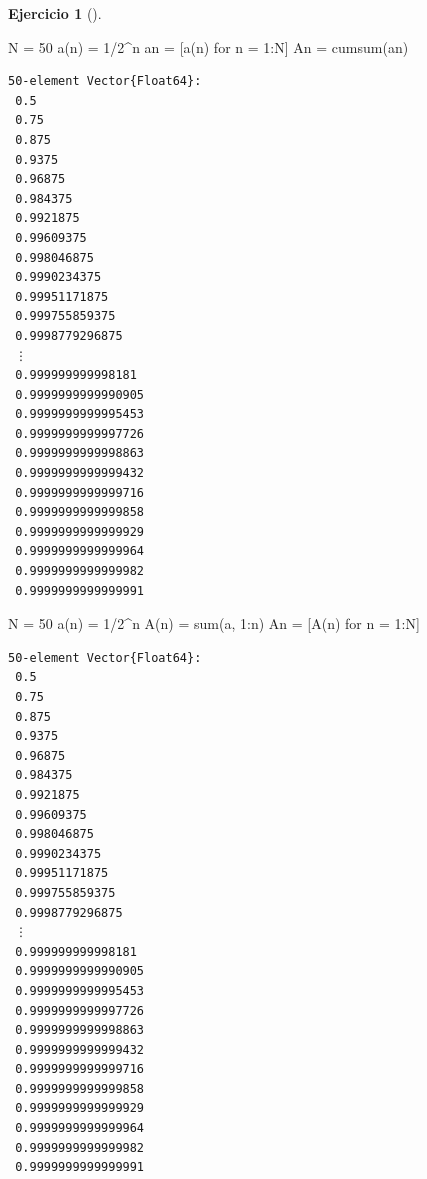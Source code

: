 \documentclass[
  a4paper,
]{scrreport}
\newenvironment{Shaded}{\begin{snugshade}}{\end{snugshade}}
\newcommand{\FloatTok}[1]{\textcolor[rgb]{0.68,0.00,0.00}{#1}}
\newcommand{\FunctionTok}[1]{\textcolor[rgb]{0.28,0.35,0.67}{#1}}
\newcommand{\NormalTok}[1]{\textcolor[rgb]{0.00,0.23,0.31}{#1}}
\newcommand{\OperatorTok}[1]{\textcolor[rgb]{0.37,0.37,0.37}{#1}}
\theoremstyle{definition}
\newtheorem{exercise}{Ejercicio}[chapter]
\theoremstyle{remark}
\begin{document}
\begin{exercise}[]
\begin{tcolorbox}
\begin{Shaded}
\begin{Highlighting}[]
\NormalTok{N }\OperatorTok{=} \FloatTok{50}
\FunctionTok{a}\NormalTok{(n) }\OperatorTok{=} \FloatTok{1}\OperatorTok{/}\FloatTok{2}\OperatorTok{\^{}}\NormalTok{n}
\NormalTok{an }\OperatorTok{=}\NormalTok{ [}\FunctionTok{a}\NormalTok{(n) for n }\OperatorTok{=} \FloatTok{1}\OperatorTok{:}\NormalTok{N]}
\NormalTok{An }\OperatorTok{=} \FunctionTok{cumsum}\NormalTok{(an)}
\end{Highlighting}
\end{Shaded}

\begin{verbatim}
50-element Vector{Float64}:
 0.5
 0.75
 0.875
 0.9375
 0.96875
 0.984375
 0.9921875
 0.99609375
 0.998046875
 0.9990234375
 0.99951171875
 0.999755859375
 0.9998779296875
 ⋮
 0.999999999998181
 0.9999999999990905
 0.9999999999995453
 0.9999999999997726
 0.9999999999998863
 0.9999999999999432
 0.9999999999999716
 0.9999999999999858
 0.9999999999999929
 0.9999999999999964
 0.9999999999999982
 0.9999999999999991
\end{verbatim}

\end{tcolorbox}

\begin{tcolorbox}[enhanced jigsaw, toptitle=1mm, colframe=quarto-callout-tip-color-frame, opacitybacktitle=0.6, colback=white, titlerule=0mm, toprule=.15mm, arc=.35mm, coltitle=black, colbacktitle=quarto-callout-tip-color!10!white, bottomtitle=1mm, bottomrule=.15mm, title=\textcolor{quarto-callout-tip-color}{\faLightbulb}\hspace{0.5em}{Solución 2}, rightrule=.15mm, opacityback=0, leftrule=.75mm, left=2mm, breakable]

\begin{Shaded}
\begin{Highlighting}[]
\NormalTok{N }\OperatorTok{=} \FloatTok{50}
\FunctionTok{a}\NormalTok{(n) }\OperatorTok{=} \FloatTok{1}\OperatorTok{/}\FloatTok{2}\OperatorTok{\^{}}\NormalTok{n}
\FunctionTok{A}\NormalTok{(n) }\OperatorTok{=} \FunctionTok{sum}\NormalTok{(a, }\FloatTok{1}\OperatorTok{:}\NormalTok{n)}
\NormalTok{An }\OperatorTok{=}\NormalTok{ [}\FunctionTok{A}\NormalTok{(n) for n }\OperatorTok{=} \FloatTok{1}\OperatorTok{:}\NormalTok{N]}
\end{Highlighting}
\end{Shaded}

\begin{verbatim}
50-element Vector{Float64}:
 0.5
 0.75
 0.875
 0.9375
 0.96875
 0.984375
 0.9921875
 0.99609375
 0.998046875
 0.9990234375
 0.99951171875
 0.999755859375
 0.9998779296875
 ⋮
 0.999999999998181
 0.9999999999990905
 0.9999999999995453
 0.9999999999997726
 0.9999999999998863
 0.9999999999999432
 0.9999999999999716
 0.9999999999999858
 0.9999999999999929
 0.9999999999999964
 0.9999999999999982
 0.9999999999999991
\end{verbatim}


\end{tcolorbox}
\end{exercise}
\end{document}
